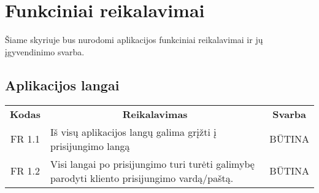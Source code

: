 \documentclass{VUMIFPSkursinis}
\begin{document}
\section{Funkciniai reikalavimai}

Šiame skyriuje bus nurodomi aplikacijos funkciniai reikalavimai ir jų įgyvendinimo svarba.

\subsection{Aplikacijos langai}

\begin{center}
	\begin{table}[H]
	\begin{tabular}{|p{2cm}|p{}|p{}|}
	\hline
	    \rowcolor{lightgray}
		\multicolumn{3}{|c|}{Aplikacijos langai}\\
		
	\hline
		\multicolumn{1}{|c|}{{\bfseries Kodas}}&
		\multicolumn{1}{|c|}{{\bfseries Reikalavimas}}&
		\multicolumn{1}{|c|}{{\bfseries Svarba}}\\

	\hline
		\multicolumn{1}{|c|}{FR 1.1} &
		Iš visų aplikacijos langų galima grįžti į prisijungimo langą &
		\multicolumn{1}{|c|}{BŪTINA}\\
	\hline
		\multicolumn{1}{|c|}{FR 1.2} &
		{Visi langai po prisijungimo turi turėti galimybę parodyti kliento \newline prisijungimo vardą/paštą.}&
		\multicolumn{1}{|c|}{BŪTINA}\\
	\hline
	

\end{tabular}
\end{table}
\end{center}
\end{document}
